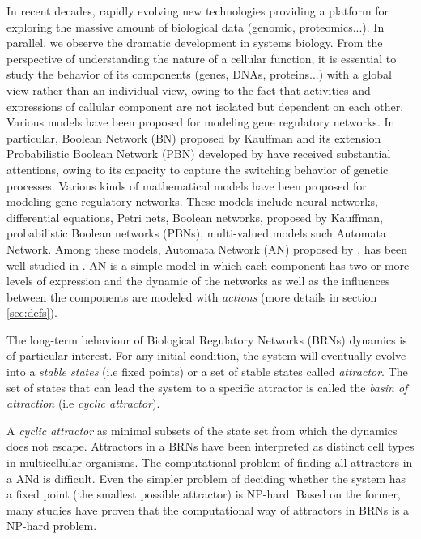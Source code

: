 
In recent decades, rapidly evolving new technologies providing a platform for exploring the massive amount of biological data (genomic, proteomics...). In parallel, we observe the dramatic development in systems biology. From the perspective of understanding the nature of a cellular function, it is essential to study the behavior of its components (genes, DNAs, proteins...) with a global view rather than an individual view, owing to the fact that activities and expressions of callular component are not isolated but dependent on each other. Various models have been proposed for modeling gene regulatory networks. In particular, Boolean Network (BN) proposed by Kauffman  and its extension Probabilistic Boolean Network (PBN) developed by have received substantial attentions, owing to its capacity to capture the switching behavior of genetic processes. 
Various kinds of mathematical models have been proposed for modeling gene regulatory networks. These models include neural networks, differential equations, Petri nets, Boolean networks, proposed by Kauffman, probabilistic Boolean networks (PBNs), multi-valued models such Automata Network. Among these models, Automata Network (AN) proposed by , has been well studied in . AN is a simple model in which each component has two or more levels of expression and the dynamic of the networks as well as the influences between the components are modeled with \emph{actions} (more details in section \ref{sec:defs}).

The long-term behaviour of Biological Regulatory Networks (BRNs) dynamics is of particular interest. For any initial condition, the system will eventually evolve into a \emph{stable states} (i.e fixed points) or a set of stable states called \emph{attractor}. The set of states that can lead the system to a specific attractor is called the \emph{basin of attraction} (i.e \emph{cyclic attractor}). 

A \emph{cyclic attractor} as minimal subsets of the state set from which the dynamics does not escape. Attractors in a BRNs have been interpreted as distinct cell types in multicellular organisms. The computational problem of finding all attractors in a ANd is difficult. Even the simpler problem of deciding whether the system has a fixed point (the smallest possible attractor) is NP-hard.
Based on the former, many studies have proven that the computational way of attractors in BRNs is a NP-hard problem. 

